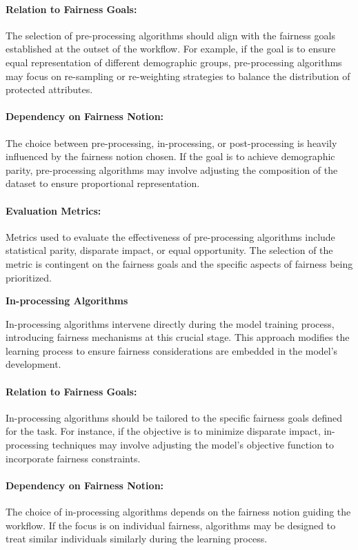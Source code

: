 \paragraph{Relation to Fairness Goals:}
The selection of pre-processing algorithms should align with the fairness goals established at the outset of the workflow. For example, if the goal is to ensure equal representation of different demographic groups, pre-processing algorithms may focus on re-sampling or re-weighting strategies to balance the distribution of protected attributes.

\paragraph{Dependency on Fairness Notion:}
The choice between pre-processing, in-processing, or post-processing is heavily influenced by the fairness notion chosen. If the goal is to achieve demographic parity, pre-processing algorithms may involve adjusting the composition of the dataset to ensure proportional representation.

\paragraph{Evaluation Metrics:}
Metrics used to evaluate the effectiveness of pre-processing algorithms include statistical parity, disparate impact, or equal opportunity. The selection of the metric is contingent on the fairness goals and the specific aspects of fairness being prioritized.

\textbf{In-processing Algorithms}

In-processing algorithms intervene directly during the model training process, introducing fairness mechanisms at this crucial stage. This approach modifies the learning process to ensure fairness considerations are embedded in the model's development.

\paragraph{Relation to Fairness Goals:}
In-processing algorithms should be tailored to the specific fairness goals defined for the task. For instance, if the objective is to minimize disparate impact, in-processing techniques may involve adjusting the model's objective function to incorporate fairness constraints.

\paragraph{Dependency on Fairness Notion:}
The choice of in-processing algorithms depends on the fairness notion guiding the workflow. If the focus is on individual fairness, algorithms may be designed to treat similar individuals similarly during the learning process.

